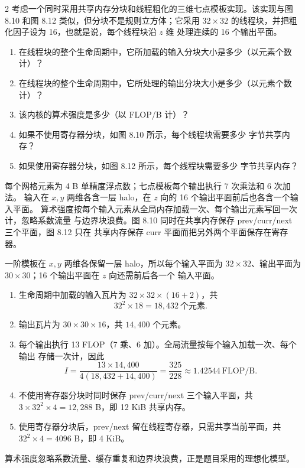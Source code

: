 \begin{solutionexercise}{2}
\problemheading 考虑一个同时采用共享内存分块和线程粗化的三维七点模板实现。该实现与图
8.10 和图 8.12 类似，但分块不是规则立方体；它采用
$32\times32$ 的线程块，并把粗化因子设为 16，也就是说，每个线程块沿 $z$ 维
处理连续的 16 个输出平面。
\begin{enumerate}[label=\alph*.,leftmargin=2.2em]
  \item 在线程块的整个生命周期中，它所加载的输入分块大小是多少（以元素个数
  计）？
  \item 在线程块的整个生命周期中，它所处理的输出分块大小是多少（以元素个数
  计）？
  \item 该内核的算术强度是多少（以 FLOP/B 计）？
  \item 如果不使用寄存器分块，如图 8.10 所示，每个线程块需要多少
  字节共享内存？
  \item 如果使用寄存器分块，如图 8.12 所示，每个线程块需要多少
  字节共享内存？
\end{enumerate}
每个网格元素为 4 B 单精度浮点数；七点模板每个输出执行 7 次乘法和 6 次加法。
输入在 $x,y$ 两维各含一层 halo，在 $z$ 向的 16 个输出平面前后也各含一个输入平面。
算术强度按每个输入元素从全局内存加载一次、每个输出元素写回一次计，忽略系数流量
与边界块浪费。图 8.10 同时在共享内存保存 prev/curr/next 三个平面，图 8.12 只在
共享内存保存 curr 平面而把另外两个平面保存在寄存器。

\approachheading 一阶模板在 $x,y$ 两维各保留一层 halo，所以每个输入平面为
$32\times32$、输出平面为 $30\times30$；16 个输出平面在 $z$ 向还需前后各一个
输入平面。

\answerheading
\begin{enumerate}[label=\alph*.,leftmargin=2.2em]
\item 生命周期中加载的输入瓦片为 $32\times32\times(16+2)$，共
\[
32^2\times18=18{,}432\ \text{个元素}.
\]
\item 输出瓦片为 $30\times30\times16$，共
$14{,}400$ 个元素。
\item 每个输出执行 13 FLOP（7 乘、6 加）。全局流量按每个输入加载一次、每个输出
存储一次计，因此
\[
I=\frac{13\times14{,}400}
        {4(18{,}432+14{,}400)}
 =\frac{325}{228}\approx1.42544\ \mathrm{FLOP/B}.
\]
\item 不使用寄存器分块时同时保存 prev/curr/next 三个输入平面，共
$3\times32^2\times4=12{,}288$ B，即 12 KiB 共享内存。
\item 使用寄存器分块后，prev/next 留在线程寄存器，只需共享当前平面，共
$32^2\times4=4096$ B，即 4 KiB。
\end{enumerate}
算术强度忽略系数流量、缓存重复和边界块浪费，正是题目采用的理想化模型。


\end{solutionexercise}
